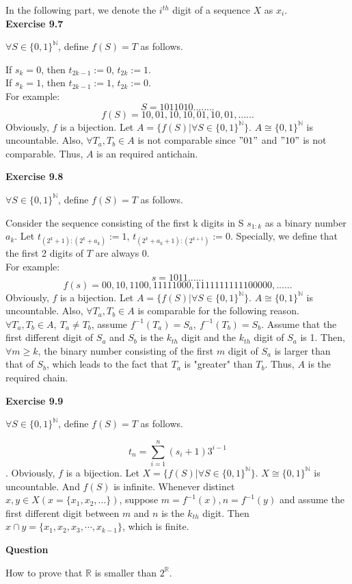\documentclass{article} %
\begin{document}
In the following part, we denote the $i^{th}$ digit of a sequence $X$ as $x_i$.\\

	\textbf{Exercise 9.7}\par
	$\forall S\in {\{0,1\}}^{\mathbb{N}}$, define $f(S)=T$ as follows.\par
	If $s_k=0$, then $t_{2k-1}:=0$, $t_{2k}:=1$.\\ If $s_k=1$, then $t_{2k-1}:=1$, $t_{2k}:=0$.\\
	For example:\\
	$$
	S=1011010........
	$$
	$$
	f(S)=10,01,10,10,01,10,01,......
	$$
	Obviously, $f$ is a bijection. Let $A=\{f(S)|\forall S\in {\{0,1\}}^{\mathbb{N}}\}$. $A\cong {\{0,1\}}^{\mathbb{N}}$ is uncountable. Also, $\forall T_{a},T_{b}\in A$ is not comparable since $"01"$ and $"10"$ is not comparable.
	Thus, $A$ is an required antichain.\par
	\textbf{Exercise 9.8}\par
	 $\forall S\in {\{0,1\}}^{\mathbb{N}}$, define $f(S)=T$ as follows.\par
	
	 	 Consider the sequence consisting of the first k digits in S $s_{1:k}$ as a binary number $a_k$. Let $t_{(2^{k}+1):(2^{k}+a_k)}:=1$, $t_{(2^{k}+a_k+1):(2^{k+1})}:=0$. Specially, we define that the first 2 digits of $T$ are always $0$.\\
	
	 For example:\\
	 $$
	 s=1011......
	 $$
	 $$
	 f(s)=00,10,1100,11111000,1111111111100000,......
	 $$
	 Obviously, $f$ is a bijection. Let $A=\{f(S)|\forall S\in {\{0,1\}}^{\mathbb{N}}\}$. $A\cong {\{0,1\}}^{\mathbb{N}}$ is uncountable. Also, $\forall T_a,T_b\in A$ is comparable for the following reason.\\
 $\forall T_a,T_b\in A,\ T_a\neq T_b$, assume $f^{-1}(T_a)=S_a,\ f^{-1}(T_b)=S_b$. Assume that the first different digit of $S_a$ and $S_b$ is the $k_{th}$ digit and the $k_{th}$ digit of $S_a$ is 1. Then, $\forall m \ge k$, the binary number consisting of the first $m$ digit of $S_a$ is larger than that of $S_b$, which leads to the fact that $T_a$ is "greater" than $T_b$. Thus, $A$ is the required chain. \par

	
  \textbf{Exercise 9.9}\par
	  $\forall S\in {\{0,1\}}^{\mathbb{N}}$, define $f(S)=T$ as follows.\par
 $$t_n=\sum_{i=1}^n(s_i+1)3^{i-1}$$.
Obviously, $f$ is a bijection. Let $X=\{f(S)|\forall S\in {\{0,1\}}^{\mathbb{N}}\}$. $X\cong {\{0,1\}}^{\mathbb{N}}$ is uncountable. And $f(S)$ is infinite. Whenever distinct $x,y \in X(x=\{x_1,x_2,...\})$, suppose $m=f^{-1}(x),n=f^{-1}(y)$ and assume the first different digit between $m$ and $n$ is the $k_{th}$ digit. Then $x\cap y=\{x_1,x_2,x_3,\cdots,x_{k-1}\}$, which is finite.
	
		\textbf{Question}\par
	 How to prove that ${\mathbb{R}}$ is smaller than $2^{\mathbb{R}}$.
	
\end{document}

